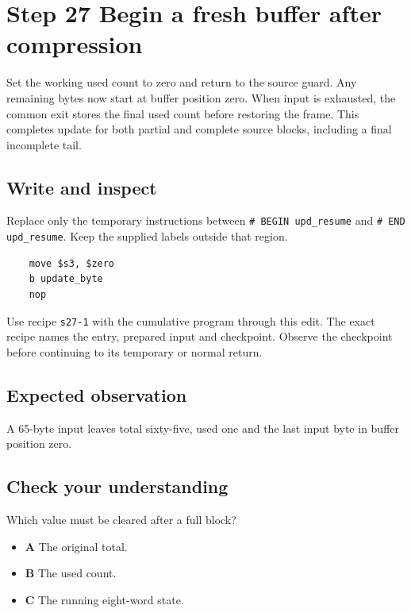 \section{Step 27 Begin a fresh buffer after compression}\label{sha-s27}

Set the working used count to zero and return to the source guard. Any remaining bytes now start at buffer position zero. When input is exhausted, the common exit stores the final used count before restoring the frame. This completes update for both partial and complete source blocks, including a final incomplete tail.

\subsection{Write and inspect}
Replace only the temporary instructions between \texttt{\# BEGIN upd\_resume} and \texttt{\# END upd\_resume}. Keep the supplied labels outside that region.

\begin{verbatim}
    move $s3, $zero
    b update_byte
    nop
\end{verbatim}

Use recipe \texttt{s27-1} with the cumulative program through this edit. The exact recipe names the entry, prepared input and checkpoint. Observe the checkpoint before continuing to its temporary or normal return.

\subsection{Expected observation}
A 65-byte input leaves total sixty-five, used one and the last input byte in buffer position zero.

\subsection{Check your understanding}
Which value must be cleared after a full block?

\begin{itemize}
  \item \textbf{A} The original total.
  \item \textbf{B} The used count.
  \item \textbf{C} The running eight-word state.
\end{itemize}
